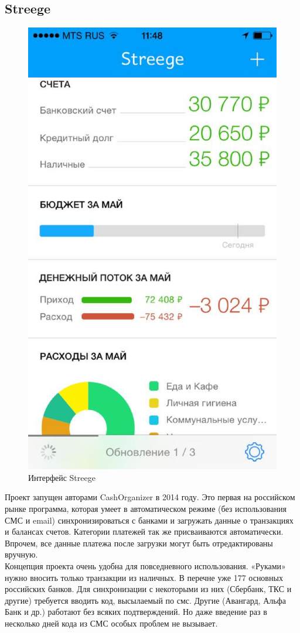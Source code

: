 \subsection*{Streege}
\begin{figure}[H]
	\centering
	\includegraphics[width=0.7\linewidth]{pics/Streege.eps}
	\caption{Интерфейс Streege}
	\label{fig:Streege}
\end{figure}
Проект запущен авторами CashOrganizer в 2014 году. Это первая на российском рынке программа, которая умеет в автоматическом режиме (без использования СМС и email) синхронизироваться с банками и загружать данные о транзакциях и балансах счетов. Категории платежей так же присваиваются автоматически. Впрочем, все данные платежа после загрузки могут быть отредактированы вручную.\\

Концепция проекта очень удобна для повседневного использования. «Руками» нужно вносить только транзакции из наличных. В перечне уже 177 основных российских банков. Для синхронизации с некоторыми из них (Сбербанк, ТКС и другие) требуется вводить код, высылаемый по смс. Другие (Авангард, Альфа Банк и др.) работают без всяких подтверждений. Но даже введение раз в несколько дней кода из СМС особых проблем не вызывает.\\


